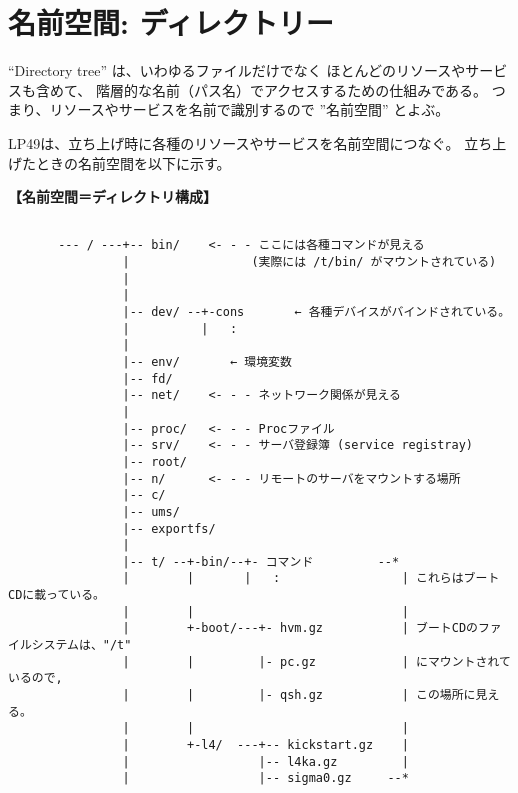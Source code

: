 \section{名前空間: ディレクトリー}

    ``Directory tree'' は、いわゆるファイルだけでなく
    ほとんどのリソースやサービスも含めて、
    階層的な名前（パス名）でアクセスするための仕組みである。
    つまり、リソースやサービスを名前で識別するので ''名前空間'' とよぶ。

   LP49は、立ち上げ時に各種のリソースやサービスを名前空間につなぐ。
   立ち上げたときの名前空間を以下に示す。

{\bf 【名前空間＝ディレクトリ構成】}\\
{\small
\begin{verbatim}

       --- / ---+-- bin/    <- - - ここには各種コマンドが見える
                |                 (実際には /t/bin/ がマウントされている)   
                |
                |
                |-- dev/ --+-cons       ← 各種デバイスがバインドされている。
                |          |   :           
                |                          
                |-- env/       ← 環境変数   
                |-- fd/                     
                |-- net/    <- - - ネットワーク関係が見える
                |
                |-- proc/   <- - - Procファイル
                |-- srv/    <- - - サーバ登録簿 (service registray) 
                |-- root/                                           
                |-- n/      <- - - リモートのサーバをマウントする場所
                |-- c/            
                |-- ums/  
                |-- exportfs/                                       
                |                                                  
                |-- t/ --+-bin/--+- コマンド         --*        
                |        |       |   :                 | これらはブートCDに載っている。
                |        |                             |                              
                |        +-boot/---+- hvm.gz           | ブートCDのファイルシステムは、"/t" 
                |        |         |- pc.gz            | にマウントされているので,
                |        |         |- qsh.gz           | この場所に見える。              
                |        |                             |               
                |        +-l4/  ---+-- kickstart.gz    |               
                |                  |-- l4ka.gz         |               
                |                  |-- sigma0.gz     --*               

\end{verbatim}}

